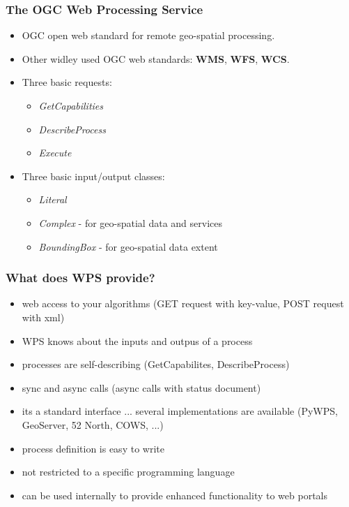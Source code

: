 \documentclass{beamer}
\begin{document}
\begin{frame}
\frametitle<presentation>{The OGC Web Processing Service}

\begin{itemize}
\item OGC open web standard for remote geo-spatial processing.
\item Other widley used OGC web standards: \textbf{WMS}, \textbf{WFS}, \textbf{WCS}.
\item Three basic requests:
\begin{itemize}
      \item  \textit{GetCapabilities}
      \item  \textit{DescribeProcess}
      \item  \textit{Execute}
\end{itemize}
\item Three basic input/output classes:
\begin{itemize}
      \item  \textit{Literal}
      \item  \textit{Complex} - for geo-spatial data and services
      \item  \textit{BoundingBox} - for geo-spatial data extent
\end{itemize}
\end{itemize}
\end{frame}

\begin{frame}
  \frametitle<presentation>{What does WPS provide?}
  \begin{itemize}
    \item web access to your algorithms (GET request with key-value, POST request with xml)
    \item WPS knows about the inputs and outpus of a process
    \item processes are self-describing (GetCapabilites, DescribeProcess)
    \item sync and async calls (async calls with status document)
    \item its a standard interface ... several implementations are available (PyWPS, GeoServer, 52 North, COWS, ...)
    \item process definition is easy to write
    \item not restricted to a specific programming language
    \item can be used internally to provide enhanced functionality to web portals
  \end{itemize}
\end{frame}
\end{document}
